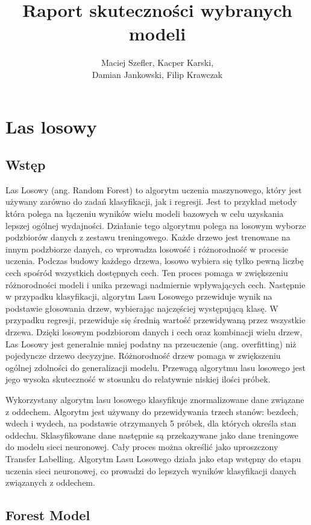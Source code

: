 \documentclass{article}
\title{Raport skuteczności wybranych modeli}
\author{Maciej Szefler, Kacper Karski,
    \\Damian Jankowski, Filip Krawczak}
\begin{document}
\maketitle

\tableofcontents

\section{Las losowy}
\subsection{Wstęp}

Las Losowy (ang. Random Forest) to algorytm uczenia maszynowego, który jest używany zarówno do zadań klasyfikacji, jak i regresji. Jest to przykład metody która polega na łączeniu wyników wielu modeli bazowych w celu uzyskania lepszej ogólnej wydajności. Działanie tego algorytmu polega na losowym wyborze podzbiorów danych z zestawu treningowego. Każde drzewo jest trenowane na innym podzbiorze danych, co wprowadza losowość i różnorodność w procesie uczenia. Podczas budowy każdego drzewa, losowo wybiera się tylko pewną liczbę cech spośród wszystkich dostępnych cech. Ten proces pomaga w zwiększeniu różnorodności modeli i unika przewagi nadmiernie wpływających cech. Następnie w przypadku klasyfikacji, algorytm Lasu Losowego przewiduje wynik na podstawie głosowania drzew, wybierając najczęściej występującą klasę. W przypadku regresji, przewiduje się średnią wartość przewidywaną przez wszystkie drzewa. Dzięki losowym podzbiorom danych i cech oraz kombinacji wielu drzew, Las Losowy jest generalnie mniej podatny na przeuczenie (ang. overfitting) niż pojedyncze drzewo decyzyjne. Różnorodność drzew pomaga w zwiększeniu ogólnej zdolności do generalizacji modelu.  Przewagą algorytmu lasu losowego jest jego wysoka skuteczność w stosunku do relatywnie niskiej ilości próbek.

Wykorzystany algorytm lasu losowego klasyfikuje znormalizowane dane związane z oddechem. Algorytm jest używany do przewidywania trzech stanów: bezdech, wdech i wydech, na podstawie otrzymanych 5 próbek, dla których określa stan oddechu. Sklasyfikowane dane następnie są przekazywane jako dane treningowe do modelu sieci neuronowej. Cały proces można określić jako uproszczony Transfer Labelling. Algorytm Lasu Losowego działa jako etap wstępny do etapu uczenia sieci neuronowej, co prowadzi do lepszych wyników klasyfikacji danych związanych z oddechem.


\subsection{Forest Model}
\end{document}
